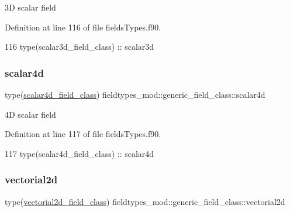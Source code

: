 3D scalar field 



Definition at line 116 of file fields\+Types.\+f90.


\begin{DoxyCode}
116         \textcolor{keywordtype}{type}(scalar3d\_field\_class) :: scalar3d
\end{DoxyCode}
\mbox{\label{structfieldtypes__mod_1_1generic__field__class_a9e48e8cd99ca98d4d8dd1f40f9002899}} 
\subsubsection{\texorpdfstring{scalar4d}{scalar4d}}
{\footnotesize\ttfamily type(\mbox{\hyperlink{structfieldtypes__mod_1_1scalar4d__field__class}{scalar4d\+\_\+field\+\_\+class}}) fieldtypes\+\_\+mod\+::generic\+\_\+field\+\_\+class\+::scalar4d\hspace{0.3cm}{\ttfamily [private]}}



4D scalar field 



Definition at line 117 of file fields\+Types.\+f90.


\begin{DoxyCode}
117         \textcolor{keywordtype}{type}(scalar4d\_field\_class) :: scalar4d
\end{DoxyCode}
\mbox{\label{structfieldtypes__mod_1_1generic__field__class_a8c04c463fb823576ae29de240eb209f5}} 
\subsubsection{\texorpdfstring{vectorial2d}{vectorial2d}}
{\footnotesize\ttfamily type(\mbox{\hyperlink{structfieldtypes__mod_1_1vectorial2d__field__class}{vectorial2d\+\_\+field\+\_\+class}}) fieldtypes\+\_\+mod\+::generic\+\_\+field\+\_\+class\+::vectorial2d\hspace{0.3cm}{\ttfamily [private]}}



